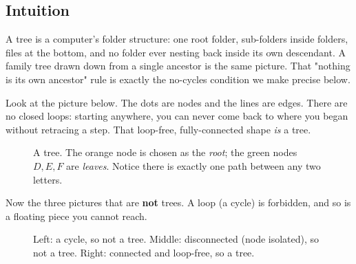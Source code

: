 \subsection{Intuition}

\begin{analogybox}
A tree is a computer's folder structure: one root folder, sub-folders inside folders,
files at the bottom, and no folder ever nesting back inside its own descendant. A family
tree drawn down from a single ancestor is the same picture. That "nothing is its own
ancestor" rule is exactly the no-cycles condition we make precise below.
\end{analogybox}

Look at the picture below. The dots are nodes and the lines are edges. There are no
closed loops: starting anywhere, you can never come back to where you began without
retracing a step. That loop-free, fully-connected shape \emph{is} a tree.

\begin{figure}[H]
\centering
{}
\caption{A tree. The orange node is chosen as the \emph{root}; the green nodes
$D, E, F$ are \emph{leaves}. Notice there is exactly one path between any two
letters.}\label{fig:c01-first-tree}
\end{figure}

Now the three pictures that are \textbf{not} trees. A loop (a cycle) is forbidden, and
so is a floating piece you cannot reach.

\begin{figure}[H]
\centering
{}
\caption{Left: a cycle, so not a tree. Middle: disconnected (node isolated), so not a
tree. Right: connected and loop-free, so a tree.}\label{fig:c01-not-trees}
\end{figure}

